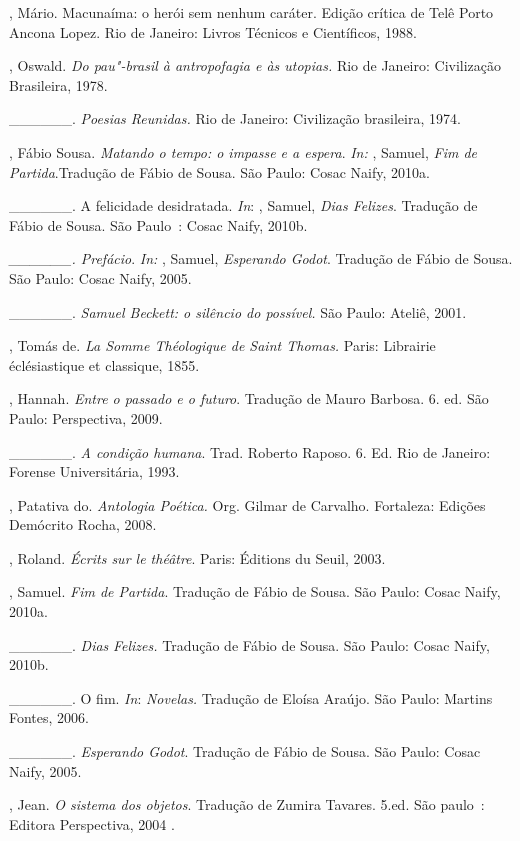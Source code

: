 {\begin{Parskip}
, Mário. Macunaíma: o herói sem nenhum caráter. Edição crítica de
Telê Porto Ancona Lopez. Rio de Janeiro: Livros Técnicos e Científicos,
1988.

, Oswald. \emph{Do pau"-brasil à antropofagia e às utopias.} Rio
de Janeiro: Civilização Brasileira, 1978.

\_\_\_\_\_\_. \emph{Poesias Reunidas.} Rio de Janeiro: Civilização
brasileira, 1974.

, Fábio Sousa. \emph{Matando o tempo: o impasse e a espera}.
\emph{In:} , Samuel, \emph{Fim de Partida}.Tradução de Fábio de
Sousa. São Paulo: Cosac Naify, 2010a.

\_\_\_\_\_\_. A felicidade desidratada. \emph{In}: , Samuel,
\emph{Dias Felizes}. Tradução de Fábio de Sousa. São Paulo~: Cosac
Naify, 2010b.

\emph{\_\_\_\_\_\_. Prefácio}. \emph{In:} , Samuel,
\emph{Esperando Godot}. Tradução de Fábio de Sousa. São Paulo: Cosac
Naify, 2005.

\_\_\_\_\_\_. \emph{Samuel Beckett: o silêncio do possível.} São
Paulo: Ateliê, 2001.

, Tomás de. \emph{La Somme Théologique de Saint Thomas.} Paris:
Librairie éclésiastique et classique, 1855.

, Hannah. \emph{Entre o passado e o futuro}. Tradução de Mauro
Barbosa. 6. ed. São Paulo: Perspectiva, 2009.

\_\_\_\_\_\_. \emph{A condição humana}. Trad. Roberto Raposo. 6. Ed.
Rio de Janeiro: Forense Universitária, 1993.

, Patativa do. \emph{Antologia Poética.} Org. Gilmar de
Carvalho. Fortaleza: Edições Demócrito Rocha, 2008.

, Roland. \emph{Écrits sur le théâtre}. Paris: Éditions du
Seuil, 2003.

, Samuel. \emph{Fim de Partida}. Tradução de Fábio de Sousa.
São Paulo: Cosac Naify, 2010a.

\_\_\_\_\_\_. \emph{Dias} \emph{Felizes.} Tradução de Fábio de
Sousa. São Paulo: Cosac Naify, 2010b.

\_\_\_\_\_\_. O fim. \emph{In}: \emph{Novelas.} Tradução de Eloísa
Araújo. São Paulo: Martins Fontes, 2006.

\_\_\_\_\_\_. \emph{Esperando Godot}. Tradução de Fábio de Sousa. São
Paulo: Cosac Naify, 2005.

, Jean. \emph{O sistema dos objetos}. Tradução de
Zumira Tavares. 5.ed. São paulo~: Editora Perspectiva, 2004 .


\end{Parskip}}
